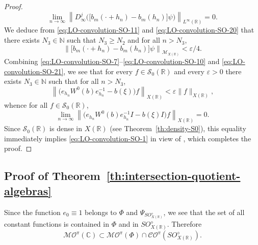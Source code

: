 \documentclass{birkjour}
\numberwithin{equation}{section}
\newcommand{\C}{\mathbb{C}}
\newcommand{\N}{\mathbb{N}}
\newcommand{\R}{\mathbb{R}}
\newcommand{\cM}{\mathcal{M}}
\newcommand{\cS}{\mathcal{S}}
\newcommand{\eps}{\varepsilon}
\begin{document}
\begin{proof}
\begin{equation}
\lim_{n\to\infty}
\left\|D_\infty^j
\big(\big[b_m(\cdot+h_n)-b_m(h_n)\big]\psi\big)
\right\|_{L^\infty(\R)}=0.
\end{equation}
We deduce from \eqref{eq:LO-convolution-SO-11} and
\eqref{eq:LO-convolution-SO-20} that there exists $N_3\in\N$ such that
$N_3\ge N_2$ and for all $n>N_3$,
\begin{equation}\label{eq:LO-convolution-SO-21}
\left\|
\big[b_m(\cdot+h_n)-b_m(h_n)\big]\psi\right\|_{\cM_{X(\R)}}<\eps/4.
\end{equation}
Combining \eqref{eq:LO-convolution-SO-7}--\eqref{eq:LO-convolution-SO-10}
and \eqref{eq:LO-convolution-SO-21}, we see that for every
$f\in\cS_0(\R)$ and every $\eps>0$ there exists $N_3\in\N$ such that
for all $n>N_3$,
\[
\left\|\big(e_{h_n}W^0(b)e_{h_n}^{-1}-b(\xi)\big)f\right\|_{X(\R)}
<
\eps\|f\|_{X(\R)},
\]
whence for all $f\in\cS_0(\R)$,
\[
\lim_{n\to\infty}\left\|\big(
e_{h_n}W^0(b)e_{h_n}^{-1}I-b(\xi)I
\big)f\right\|_{X(\R)}=0.
\]
Since $\cS_0(\R)$ is dense in $X(\R)$ (see Theorem~\ref{th:density-S0}),
this equality immediately implies \eqref{eq:LO-convolution-SO-1}
in view of \cite[Lemma~1.4.1(ii)]{RSS11}, which completes the proof.
\end{proof}
\subsection{Proof of Theorem~\ref{th:intersection-quotient-algebras}}
{Since} the function $e_0\equiv 1$ belongs to $\Phi$ and
$\Psi_{SO_{X(\R)}^\diamond}$, we see that the set of all constant
functions is contained in $\Phi$ and in
{$SO_{X(\R)}^\diamond$.}
Therefore
\begin{equation}\label{eq:intersection-quotient-algebras-2}
\mathcal{MO}^\pi(\C)\subset
\mathcal{MO}^\pi(\Phi)
\cap
\mathcal{CO}^\pi
{(SO_{X(\R)}^\diamond).}
\end{equation}
\end{document}
